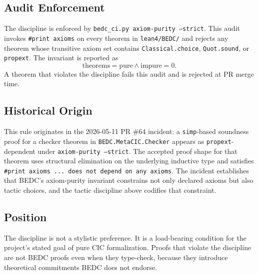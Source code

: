 \subsection{Audit Enforcement}\label{subsec:audit-enforcement}

The discipline is enforced by \texttt{bedc\_ci.py axiom-purity --strict}.
This audit invokes \texttt{\#print axioms} on every theorem in
\texttt{lean4/BEDC/} and rejects any theorem whose transitive axiom set
contains \texttt{Classical.choice}, \texttt{Quot.sound}, or
\texttt{propext}. The invariant is reported as
$$
\mathrm{theorems} = \mathrm{pure} \wedge \mathrm{impure} = 0.
$$
A theorem that violates the discipline fails this audit and is rejected
at PR merge time.

\subsection{Historical Origin}\label{subsec:tactic-origin}

This rule originates in the 2026-05-11 PR \#64 incident: a
\texttt{simp}-based soundness proof for a checker theorem in
\texttt{BEDC.MetaCIC.Checker} appears as \texttt{propext}-dependent under
\texttt{axiom-purity --strict}. The accepted proof shape for that theorem
uses structural elimination on the underlying inductive type and satisfies
\texttt{\#print axioms ... does not depend on any axioms}. The incident
establishes that BEDC's axiom-purity invariant constrains not only declared
axioms but also tactic choices, and the tactic discipline above codifies
that constraint.

\subsection{Position}\label{subsec:tactic-position}

The discipline is not a stylistic preference. It is a load-bearing
condition for the project's stated goal of pure CIC formalization.
Proofs that violate the discipline are not BEDC proofs even when they
type-check, because they introduce theoretical commitments BEDC does
not endorse.
